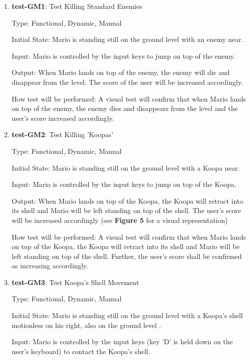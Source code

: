 \documentclass[12pt, titlepage]{article}
\begin{document}
\begin{enumerate}

\item{\textbf{test-GM1}: Test Killing Standard Enemies\\}

Type: Functional, Dynamic, Manual

Initial State: Mario is standing still on the ground level with an enemy near.

Input: Mario is controlled by the input keys to jump on top of the enemy.

Output: When Mario lands on top of the enemy, the enemy will die and disappear from the level. The score of the user will be increased accordingly.

How test will be performed: A visual test will confirm that when Mario lands on top of the enemy, the enemy dies and disappears from the level and the user's score increased accordingly.

\item{\textbf{test-GM2}: Test Killing 'Koopas'\\}

Type: Functional, Dynamic, Manual

Initial State: Mario is standing still on the ground level with a Koopa near.

Input: Mario is controlled by the input keys to jump on top of the Koopa.

Output: When Mario lands on top of the Koopa, the Koopa will retract into its shell and Mario will be left standing on top of the shell. The user's score will be increased accordingly (see \textbf{Figure 5} for a visual representation)

How test will be performed: A visual test will confirm that when Mario lands on top of the Koopa, the Koopa will retract into its shell and Mario will be left standing on top of the shell. Further, the user's score shall be confirmed as increasing accordingly.

\item{\textbf{test-GM3}: Test Koopa's Shell Movement\\}

Type: Functional, Dynamic, Manual

Initial State: Mario is standing still on the ground level with a Koopa's shell motionless on his right, also on the ground level .

Input: Mario is controlled by the input keys (key 'D' is held down on the user's keyboard) to contact the Koopa's shell.


\end{enumerate}
\end{document}
